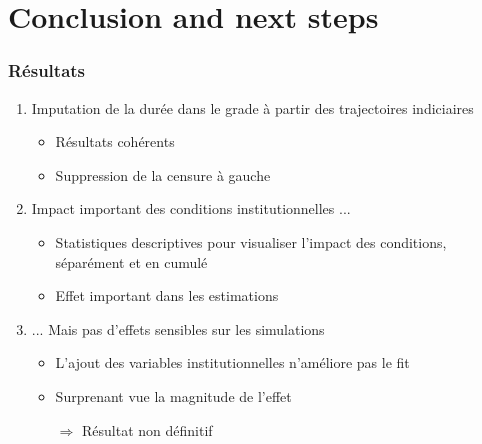 \documentclass[xcolor=table,ignorenonframetext,12pt]{beamer}
\newenvironment{choixmarges}[2]{\begin{list}{}{%
\setlength{\topsep}{0pt}%
\setlength{\leftmargin}{0pt}%
\setlength{\rightmargin}{0pt}%
\setlength{\listparindent}{\parindent}%
\setlength{\itemindent}{\parindent}%
\setlength{\parsep}{0pt plus 1pt}%
\addtolength{\leftmargin}{#1}%
\addtolength{\rightmargin}{#2}%
}\item }{\end{list}}
\begin{document}
\section{Conclusion and next steps}


\begin{frame}

\frametitle{Résultats}

\begin{choixmarges}{-0.5cm}{-0.5cm}

\begin{enumerate}
\item Imputation de la durée dans le grade à partir des trajectoires indiciaires
\begin{itemize}
\item Résultats cohérents
\item Suppression de la censure à gauche
\end{itemize}

\vspace{0.2cm}
\item Impact important des conditions institutionnelles ...
\begin{itemize}
\item Statistiques descriptives pour visualiser l'impact des conditions, séparément et en cumulé
\item Effet important dans les estimations
\end{itemize}

\vspace{0.2cm}
\item ... Mais pas d'effets sensibles sur les simulations
\begin{itemize}
\item L'ajout des variables institutionnelles n'améliore pas le fit
\item Surprenant vue la magnitude de l'effet
\item[$\Rightarrow$] Résultat non définitif
\end{itemize}

\end{enumerate}
\end{choixmarges}
\end{frame}
\end{document}
